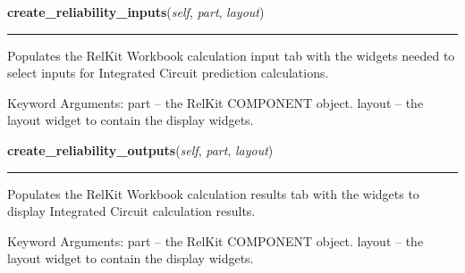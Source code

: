     \label{reliafree:integrated_circuits:ic:IntegratedCircuit:create_reliability_inputs}

    \vspace{0.5ex}

\hspace{.8\funcindent}\begin{boxedminipage}{\funcwidth}

    \raggedright \textbf{create\_reliability\_inputs}(\textit{self}, \textit{part}, \textit{layout})

    \vspace{-1.5ex}

    \rule{\textwidth}{0.5\fboxrule}
\setlength{\parskip}{2ex}
    Populates the RelKit Workbook calculation input tab with the widgets
    needed to select inputs for Integrated Circuit prediction calculations.

    Keyword Arguments: part   -- the RelKit COMPONENT object. layout -- 
    the layout widget to contain the display widgets.

\setlength{\parskip}{1ex}
    \end{boxedminipage}

    \label{reliafree:integrated_circuits:ic:IntegratedCircuit:create_reliability_outputs}

    \vspace{0.5ex}

\hspace{.8\funcindent}\begin{boxedminipage}{\funcwidth}

    \raggedright \textbf{create\_reliability\_outputs}(\textit{self}, \textit{part}, \textit{layout})

    \vspace{-1.5ex}

    \rule{\textwidth}{0.5\fboxrule}
\setlength{\parskip}{2ex}
    Populates the RelKit Workbook calculation results tab with the 
    widgets to display Integrated Circuit calculation results.

    Keyword Arguments: part   -- the RelKit COMPONENT object. layout -- 
    the layout widget to contain the display widgets.

\setlength{\parskip}{1ex}
    \end{boxedminipage}


